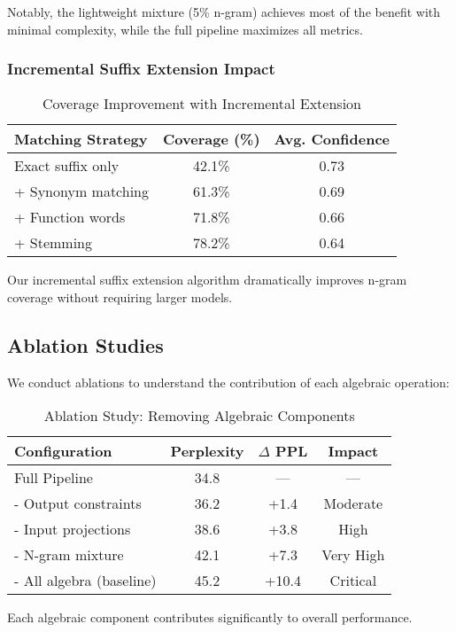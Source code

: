 \documentclass{article}
\theoremstyle{definition}
\begin{document}
Notably, the lightweight mixture (5\% n-gram) achieves most of the benefit with minimal complexity, while the full pipeline maximizes all metrics.

\subsubsection{Incremental Suffix Extension Impact}

\begin{table}[h]
\centering
\caption{Coverage Improvement with Incremental Extension}
\begin{tabular}{lcc}
\toprule
Matching Strategy & Coverage (\%) & Avg. Confidence \\
\midrule
Exact suffix only & 42.1\% & 0.73 \\
+ Synonym matching & 61.3\% & 0.69 \\
+ Function words & 71.8\% & 0.66 \\
+ Stemming & 78.2\% & 0.64 \\
\bottomrule
\end{tabular}
\end{table}

Our incremental suffix extension algorithm dramatically improves n-gram coverage without requiring larger models.

\subsection{Ablation Studies}

We conduct ablations to understand the contribution of each algebraic operation:

\begin{table}[h]
\centering
\caption{Ablation Study: Removing Algebraic Components}
\begin{tabular}{lccc}
\toprule
Configuration & Perplexity & $\Delta$ PPL & Impact \\
\midrule
Full Pipeline & 34.8 & --- & --- \\
- Output constraints & 36.2 & +1.4 & Moderate \\
- Input projections & 38.6 & +3.8 & High \\
- N-gram mixture & 42.1 & +7.3 & Very High \\
- All algebra (baseline) & 45.2 & +10.4 & Critical \\
\bottomrule
\end{tabular}
\end{table}

Each algebraic component contributes significantly to overall performance.
\end{document}

